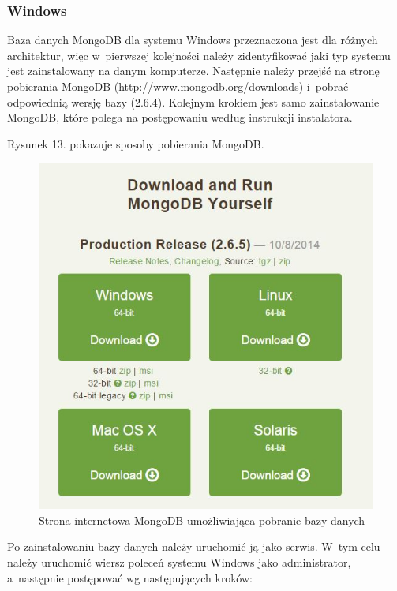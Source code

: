 \documentclass[12pt,a4paper,notitlepage]{article}
\begin{document}
\subsubsection{Windows}
Baza danych MongoDB dla systemu Windows przeznaczona jest dla różnych architektur, więc w~pierwszej kolejności należy zidentyfikować jaki typ systemu jest zainstalowany na danym komputerze. Następnie należy przejść na stronę pobierania MongoDB (http://www.mongodb.org/downloads) i~pobrać odpowiednią wersję bazy (2.6.4). Kolejnym krokiem jest samo zainstalowanie MongoDB, które polega na postępowaniu według instrukcji instalatora.
\par Rysunek 13. pokazuje sposoby pobierania MongoDB.
\begin{figure}[H]
    \centering
    \includegraphics[width=\linewidth]{obrazy/mongoWdr}
    \caption{Strona internetowa MongoDB umożliwiająca pobranie bazy danych}
\end{figure} 
Po zainstalowaniu bazy danych należy uruchomić ją jako serwis. W~tym celu należy uruchomić wiersz poleceń systemu Windows jako administrator, a~następnie postępować wg następujących kroków: \\
\end{document}
